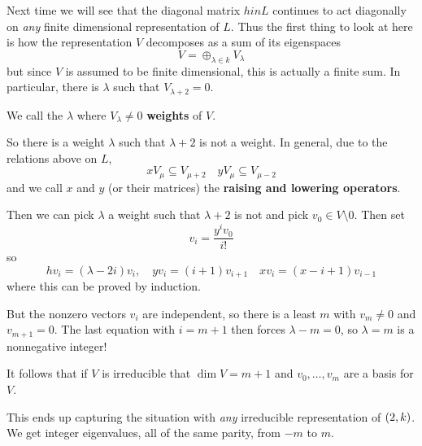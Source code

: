 \documentclass[12pt]{article}
\theoremstyle{nonumberbreak}
\theoremstyle{changebreak}
\theoremstyle{nonumberbreak}
\theoremstyle{change}
\let\sl\relax
\DeclareMathOperator{\sl}{\mathfrak{sl}}
\begin{document}
Next time we will see that the diagonal matrix $hin L$ continues to act diagonally on \textit{any} finite dimensional representation of $L$.
Thus the first thing to look at here is how the representation $V$ decomposes as a sum of its eigenspaces
\[V=\oplus_{\lambda\in k}V_\lambda\]
but since $V$ is assumed to be finite dimensional, this is actually a finite sum. In particular, there is $\lambda$ such that 
$V_{\lambda+2}=0$.
\begin{defn}
	We call the $\lambda$ where $V_\lambda\ne 0$ \textbf{weights} of $V$.
\end{defn}
So there is a weight $\lambda$ such that $\lambda+2$ is not a weight. In general, due to the relations above on $L$,
\[xV_\mu\subseteq V_{\mu+2}\quad yV_\mu\subseteq V_{\mu-2}\]
and we call $x$ and $y$ (or their matrices) the \textbf{raising and lowering operators}.

Then we can pick $\lambda$ a weight such that $\lambda+2$ is not and pick $v_0\in V\setminus 0$. Then set
\[v_i=\frac{y^iv_0}{i!}\]
so 
\[hv_i=(\lambda-2i)v_i,\quad yv_i=(i+1)v_{i+1}\quad xv_i=(x-i+1)v_{i-1}\]
where this can be proved by induction.

But the nonzero vectors $v_i$ are independent, so there is a least $m$ with $v_m\ne 0$ and $v_{m+1}=0$. 
The last equation with $i=m+1$ then forces $\lambda-m=0$, so $\lambda=m$ is a nonnegative integer!

It follows that if $V$ is irreducible that $\dim V=m+1$ and $v_0,\dots,v_m$ are a basis for $V$.

This ends up capturing the situation with \textit{any} irreducible representation of $\sl(2,k)$. We get integer eigenvalues, all of the same parity, from $-m$ to $m$.
\end{document}
